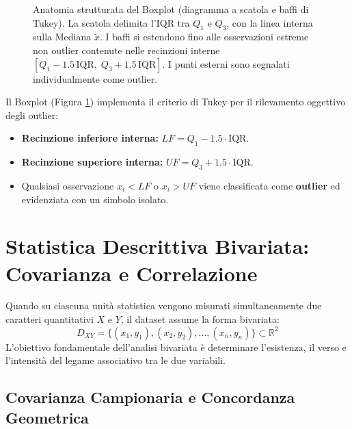 \begin{figure}[htbp]
\centering

\caption{Anatomia strutturata del Boxplot (diagramma a scatola e baffi di Tukey). La scatola delimita l'IQR tra $Q_1$ e $Q_3$, con la linea interna sulla Mediana $\widetilde{x}$. I baffi si estendono fino alle osservazioni estreme non outlier contenute nelle recinzioni interne $[Q_1 - 1.5\,\text{IQR}, \; Q_3 + 1.5\,\text{IQR}]$. I punti esterni sono segnalati individualmente come outlier.}
\label{fig:boxplot_anatomia}
\end{figure}

Il Boxplot (Figura \ref{fig:boxplot_anatomia}) implementa il criterio di Tukey per il rilevamento oggettivo degli outlier:
\begin{itemize}
    \item \textbf{Recinzione inferiore interna:} $LF = Q_1 - 1.5 \cdot \text{IQR}$.
    \item \textbf{Recinzione superiore interna:} $UF = Q_3 + 1.5 \cdot \text{IQR}$.
    \item Qualsiasi osservazione $x_i < LF$ o $x_i > UF$ viene classificata come \textbf{outlier} ed evidenziata con un simbolo isolato.
\end{itemize}

\section{Statistica Descrittiva Bivariata: Covarianza e Correlazione}
\label{sec:statistica_bivariata}

Quando su ciascuna unità statistica vengono misurati simultaneamente due caratteri quantitativi $X$ e $Y$, il dataset assume la forma bivariata:
\begin{equation}
D_{XY} = \{(x_1, y_1), (x_2, y_2), \dots, (x_n, y_n)\} \subset \mathbb{R}^2
\end{equation}
L'obiettivo fondamentale dell'analisi bivariata è determinare l'esistenza, il verso e l'intensità del legame associativo tra le due variabili.

\subsection{Covarianza Campionaria e Concordanza Geometrica}

